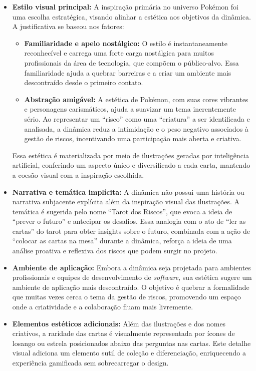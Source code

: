 \documentclass[
	12pt,
	openright,
	twoside,
	a4paper,
	english,
	brazil
	]{abntex2}
\begin{document}
\begin{itemize}
\item \textbf{Estilo visual principal:} A inspiração primária no universo Pokémon foi uma escolha estratégica, visando alinhar a estética aos objetivos da dinâmica. A justificativa se baseou nos fatores:
\begin{itemize}
\item \textbf{Familiaridade e apelo nostálgico:} O estilo é instantaneamente reconhecível e carrega uma forte carga nostálgica para muitos profissionais da área de tecnologia, que compõem o público-alvo. Essa familiaridade ajuda a quebrar barreiras e a criar um ambiente mais descontraído desde o primeiro contato.
\item \textbf{Abstração amigável:} A estética de Pokémon, com suas cores vibrantes e personagens carismáticos, ajuda a suavizar um tema inerentemente sério. Ao representar um “risco” como uma “criatura” a ser identificada e analisada, a dinâmica reduz a intimidação e o peso negativo associados à gestão de riscos, incentivando uma participação mais aberta e criativa.
\end{itemize}
Essa estética é materializada por meio de ilustrações geradas por inteligência artificial, conferindo um aspecto único e diversificado a cada carta, mantendo a coesão visual com a inspiração escolhida. 
\item \textbf{Narrativa e temática implícita:} A dinâmica não possui uma história ou narrativa subjacente explícita além da inspiração visual das ilustrações. A temática é sugerida pelo nome “Tarot dos Riscos”, que evoca a ideia de “prever o futuro” e antecipar os desafios. Essa analogia com o ato de “ler as cartas” do tarot para obter insights sobre o futuro, combinada com a ação de “colocar as cartas na mesa” durante a dinâmica, reforça a ideia de uma análise proativa e reflexiva dos riscos que podem surgir no projeto. 
\item \textbf{Ambiente de aplicação:} Embora a dinâmica seja projetada para ambientes profissionais e equipes de desenvolvimento de \textit{software}, sua estética sugere um ambiente de aplicação mais descontraído. O objetivo é quebrar a formalidade que muitas vezes cerca o tema da gestão de riscos, promovendo um espaço onde a criatividade e a colaboração fluam mais livremente. 
\item \textbf{Elementos estéticos adicionais:} Além das ilustrações e dos nomes criativos, a raridade das cartas é visualmente representada por ícones de losango ou estrela posicionados abaixo das perguntas nas cartas. Este detalhe visual adiciona um elemento sutil de coleção e diferenciação, enriquecendo a experiência gamificada sem sobrecarregar o design. 
\end{itemize}
\end{document}
